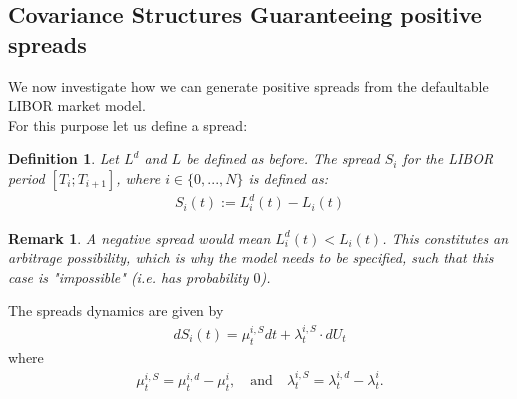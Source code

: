 \documentclass[12pt]{article}
\newtheorem{remark}[theorem]{Remark}
\newtheorem{definition}[theorem]{Definition}
\begin{document}
	
	\subsection{Covariance Structures Guaranteeing positive spreads}
	We now investigate how we can generate positive spreads from the defaultable LIBOR market model.\\
	For this purpose let us define a spread:
	\begin{definition}
		Let $L^d$ and $L$ be defined as before.
		The \emph{spread} $S_i$ for the LIBOR period $[T_i; T_{i+1}]$, where $i \in \{0, ..., N\}$ is defined as:
		\begin{align*}
			S_i(t) := L^d_i(t) - L_i(t)
		\end{align*}
	\end{definition}
	\begin{remark}
		A negative spread would mean $L^d_i(t) < L_i(t)$. This constitutes an arbitrage possibility, %
		which is why the model needs to be specified, such that this case is "impossible" (i.e. has probability $0$).
	\end{remark}
	The spreads dynamics are given by
	\begin{align*}
		dS_i(t) = \mu^{i,S}_t dt + \lambda^{i,S}_t \cdot dU_t
	\end{align*}
	where 
	\begin{align*}
		\mu^{i,S}_t = \mu^{i,d}_t - \mu^{i}_t, \quad \text{and} 
		\quad \lambda^{i,S}_t = \lambda^{i,d}_t - \lambda^{i}_t.
	\end{align*}
	
\end{document}
